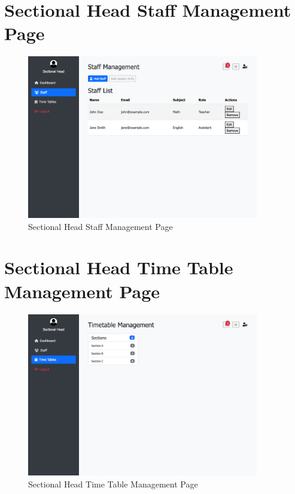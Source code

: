 \documentclass[12pt,a4paper]{report}
\begin{document}
\section{Sectional Head Staff Management Page}
\begin{figure}[htbp]
    \centering
    \includegraphics[width=0.9\textwidth]{sectionalhead-staff-management-page.png}
    \caption{Sectional Head Staff Management Page}
    \label{fig:sectionalhead-staff-management-page}
\end{figure}

\section{Sectional Head Time Table Management Page}
\begin{figure}[htbp]
    \centering
    \includegraphics[width=0.9\textwidth]{sectionalhead-time-table-management-page.png}
    \caption{Sectional Head Time Table Management Page}
    \label{fig:sectionalhead-time-table-management-page}
\end{figure}
\end{document}
